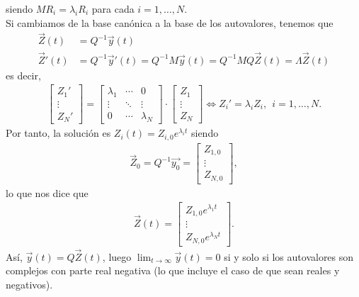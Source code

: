 siendo $MR_i = \lambda_iR_i$ para cada $i = 1,\ldots,N$.
\\
\newline
Si cambiamos de la base canónica a la base de los autovalores, tenemos que
\begin{align*}
    \overrightarrow{Z}(t) &= Q^{-1}\overrightarrow{y}(t) \\
    \overrightarrow{Z}'(t) &= Q^{-1}\overrightarrow{y}'(t) = Q^{-1}M\overrightarrow{y}(t) = Q^{-1}MQ\overrightarrow{Z}(t) = \Lambda \overrightarrow{Z}(t)
\end{align*}
es decir,
\begin{align*}
    \begin{bmatrix}
Z_1'\\
\vdots\\
Z_N '
\end{bmatrix} = \begin{bmatrix}
\lambda_1 & \cdots & 0\\
\vdots & \ddots & \vdots \\
0 & \cdots & \lambda_N
\end{bmatrix} \cdot \begin{bmatrix}
Z_1\\
\vdots\\
Z_N 
\end{bmatrix} \Longleftrightarrow Z_i' = \lambda _i Z_i, \ \ i = 1,\ldots,N.
\end{align*}
Por tanto, la solución es $Z_i(t) = Z_{i,0}e^{\lambda_i t}$ siendo 
\begin{align*}
    \overrightarrow{Z}_0 = Q^{-1}\overrightarrow{y_0} = \begin{bmatrix}
Z_{1,0} \\
\vdots\\
Z_{N,0}
\end{bmatrix},
\end{align*}
lo que nos dice que
\begin{align*}
    \overrightarrow{Z}(t) = \begin{bmatrix}
Z_{1,0}e^{\lambda_1 t}\\
\vdots\\
Z_{N,0}e^{\lambda_N t}
\end{bmatrix}.
\end{align*}
Así, $\overrightarrow{y}(t) = Q\overrightarrow{Z}(t)$, luego $\lim_{t \to \infty} \overrightarrow{y}(t) = 0$ si y solo si los autovalores son complejos con parte real negativa (lo que incluye el caso de que sean reales y negativos).
\\
\newline
